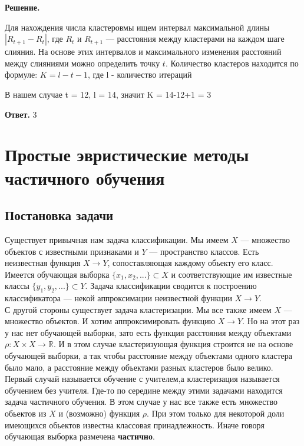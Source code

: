 \textbf{Решение.}

Для нахождения числа кластеровмы ищем интервал максимальной длины \( |R_{t+1} - R_t| \), где \( R_t \) и \( R_{t+1} \) — расстояния между кластерами на каждом шаге слияния. На основе этих интервалов и максимального изменения расстояний между слияниями можно определить точку \( t \).
Количество кластеров находится по формуле: 
$K=l - t - 1$, где l - количество итераций

В нашем случае t = 12, l = 14, значит K = 14-12+1 = 3

\textbf{Ответ.} 3

\section{Простые эвристические методы частичного обучения}
\subsection{Постановка задачи}
Существует привычная нам задача классификации. Мы имеем $X$ --- множество объектов с известными признаками и $Y$ --- пространство классов. Есть неизвестная функция $X \longrightarrow Y$, сопоставляющая каждому обьекту его класс. Имеется обучающая выборка $\{x_1, x_2, ...\} \subset X$ и соответствующие им известные классы $\{y_1, y_2, ...\} \subset Y$. Задача классификации сводится к построению классификатора --- некой аппроксимации неизвестной функции $X \longrightarrow Y$. \\

С другой стороны существует задача кластеризации. Мы все также имеем $X$ --- множество объектов. И хотим аппроксимировать функцию $X \longrightarrow Y$. Но на этот раз у нас нет обучающей выборки, зато есть функция расстояния между объектами $\rho: X\times X \longrightarrow \mathbb{R}$. И в этом случае кластеризующая функция строится не на основе обучающей выборки, а так чтобы расстояние между объектами одного кластера было мало, а расстояние между объектами разных кластеров было велико. \\

Первый случай называется обучение с учителем,а кластеризация называется обучением без учителя. Где-то по середине между этими задачами находится задача частичного обучения. В этом случае у нас все также есть множество обьектов из $X$ и (возможно) функция $\rho$. При этом только для некоторой доли имеющихся обьектов известна классовая принадлежность. Иначе говоря обучающая выборка размечена \textbf{частично}. \\

